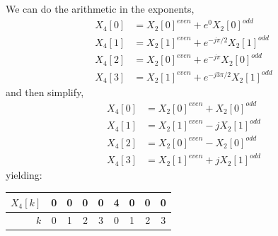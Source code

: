 We can do the arithmetic in the exponents,
\begin{align*}
  X_4[0] &= X_2[0]^{\mathit{even}} +   e^0 X_2[0]^{\mathit{odd}} \\
  X_4[1] &= X_2[1]^{\mathit{even}} +   e^{-j\pi/2} X_2[1]^{\mathit{odd}} \\
  X_4[2] &= X_2[0]^{\mathit{even}} +   e^{-j\pi} X_2[0]^{\mathit{odd}} \\
  X_4[3] &= X_2[1]^{\mathit{even}} +   e^{-j3\pi/2}X_2[1]^{\mathit{odd}}
\end{align*}
and then simplify,
\begin{align*}
  X_4[0] &= X_2[0]^{\mathit{even}} +   X_2[0]^{\mathit{odd}} \\
  X_4[1] &= X_2[1]^{\mathit{even}} -   j X_2[1]^{\mathit{odd}} \\
  X_4[2] &= X_2[0]^{\mathit{even}} -   X_2[0]^{\mathit{odd}} \\
  X_4[3] &= X_2[1]^{\mathit{even}} +   j X_2[1]^{\mathit{odd}}
\end{align*}
yielding:
\begin{center}
  \begin{tabular}{r|c|c|c|c||c|c|c|c|} \hline
    $X_4[k]$ & 0   & 0   & 0   & 0   & 4   & 0   & 0   & 0   \\ \hline
    $k$        & 0   & 1   & 2   & 3   & 0   & 1   & 2   & 3   \\ \hline
  \end{tabular}
\end{center}

